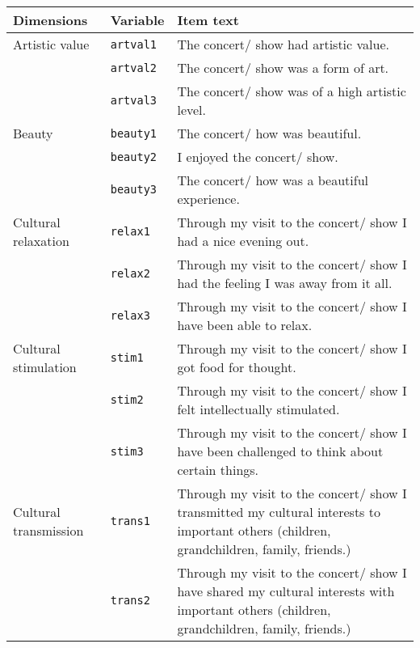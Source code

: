 \begin{table}[!ht]
    \centering
    \begin{tabular}{llp{11cm}}
        \hline \textbf{Dimensions}     & \textbf{Variable} & \textbf{Item text} \\ \hline

        Artistic value          & \texttt{artval1}   & The concert/ show had artistic value. \\
                                & \texttt{artval2}   & The concert/ show was a form of art. \\
                                & \texttt{artval3}   & The concert/ show was of a high artistic level. \\
        \hline
        Beauty                  & \texttt{beauty1}   & The concert/ how was beautiful. \\
                                & \texttt{beauty2}   & I enjoyed the concert/ show. \\
                                & \texttt{beauty3}   & The concert/ how was a beautiful experience. \\
        \hline
        Cultural relaxation     & \texttt{relax1}    & Through my visit to the concert/ show I had a nice evening out. \\
                                & \texttt{relax2}    & Through my visit to the concert/ show I had the feeling I was away from it all. \\
                                & \texttt{relax3}    & Through my visit to the concert/ show I have been able to relax. \\
        \hline
        Cultural stimulation    & \texttt{stim1}     & Through my visit to the concert/ show I got food for thought. \\
                                & \texttt{stim2}     & Through my visit to the concert/ show I felt intellectually stimulated. \\
                                & \texttt{stim3}     & Through my visit to the concert/ show I have been challenged to think about certain things. \\
        \hline
        Cultural transmission   & \texttt{trans1}    & Through my visit to the concert/ show I transmitted my cultural interests to important others (children, grandchildren, family, friends.) \\
                                & \texttt{trans2}    & Through my visit to the concert/ show I have shared my cultural interests with important others (children, grandchildren, family, friends.) \\

\end{tabular}
\end{table}
